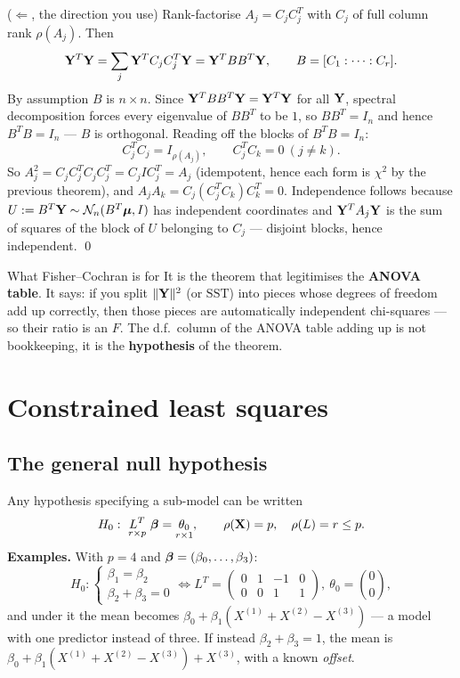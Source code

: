 \documentclass[11pt]{article}
\begin{document}
\prf ($\Leftarrow$, the direction you use) Rank-factorise $A_j=C_jC_j^T$ with $C_j$ of full
column rank $\rho(A_j)$. Then
\[
  \mathbf{Y}^T\mathbf{Y}=\sum_j\mathbf{Y}^TC_jC_j^T\mathbf{Y}=\mathbf{Y}^TBB^T\mathbf{Y},\qquad B=[C_1:\cdots:C_r] .
\]
By assumption $B$ is $n\times n$. Since $\mathbf{Y}^TBB^T\mathbf{Y}=\mathbf{Y}^T\mathbf{Y}$ for all $\mathbf{Y}$, spectral
decomposition forces every eigenvalue of $BB^T$ to be $1$, so $BB^T=I_n$ and hence
$B^TB=I_n$ --- $B$ is orthogonal. Reading off the blocks of $B^TB=I_n$:
\[
  C_j^TC_j=I_{\rho(A_j)}, \qquad C_j^TC_k=0\ (j\ne k) .
\]
So $A_j^2=C_jC_j^TC_jC_j^T=C_jI C_j^T=A_j$ (idempotent, hence each form is $\chi^2$ by the
previous theorem), and $A_jA_k=C_j(C_j^TC_k)C_k^T=0$. Independence follows because
$U:=B^T\mathbf{Y}\sim\mathcal{N}_n(B^T\boldsymbol{\mu},I)$ has independent coordinates and $\mathbf{Y}^TA_j\mathbf{Y}$ is the sum of
squares of the block of $U$ belonging to $C_j$ --- disjoint blocks, hence independent. \qed

\begin{idea}{What Fisher--Cochran is for}
It is the theorem that legitimises the \textbf{ANOVA table}. It says: if you split
$\|\mathbf{Y}\|^2$ (or $\mathrm{SST}$) into pieces whose degrees of freedom add up correctly, then
those pieces are automatically independent chi-squares --- so their ratio is an $F$. The
d.f.\ column of the ANOVA table adding up is not bookkeeping, it is the \textbf{hypothesis}
of the theorem.
\end{idea}

\section{Constrained least squares}

\subsection{The general null hypothesis}

Any hypothesis specifying a sub-model can be written
\[
  H_0:\ \underset{r\times p}{L^T}\ \bb=\underset{r\times1}{\theta_0},
  \qquad \rho(\bX)=p,\quad \rho(L)=r\le p .
\]
\textbf{Examples.} With $p=4$ and $\boldsymbol{\beta}=(\beta_0,\dots,\beta_3)$:
\[
  H_0:\begin{cases}\beta_1=\beta_2\\ \beta_2+\beta_3=0\end{cases}
  \iff
  L^T=\begin{pmatrix}0&1&-1&0\\0&0&1&1\end{pmatrix},\ \theta_0=\binom00 ,
\]
and under it the mean becomes $\beta_0+\beta_1(X^{(1)}+X^{(2)}-X^{(3)})$ --- a model with
one predictor instead of three. If instead $\beta_2+\beta_3=1$, the mean is
$\beta_0+\beta_1(X^{(1)}+X^{(2)}-X^{(3)})+X^{(3)}$, with a known \emph{offset}.
\end{document}
